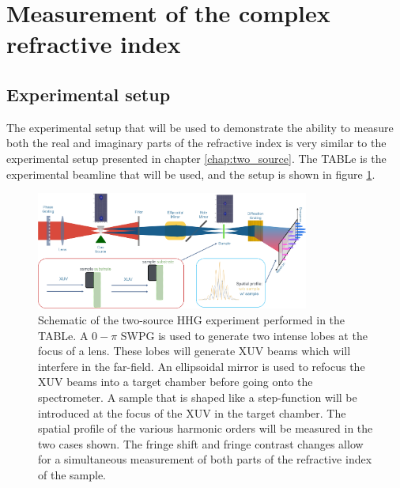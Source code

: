 \section{Measurement of the complex refractive index}
\subsection{Experimental setup}
\label{sec:experimental_setup_refrac}
The experimental setup that will be used to demonstrate the ability to measure both the real and imaginary parts of the refractive index is very similar to the experimental setup presented in chapter \ref{chap:two_source}.  The TABLe is the experimental beamline that will be used, and the setup is shown in figure \ref{fig:refract_schematic}.
\begin{figure}
	\centering
	\includegraphics[width=0.8\textwidth]{figures/refractive_index/experimental_setup.png}
	\caption[Schematic of using two-source HHG to measure the real and imaginary part of the refractive index]{Schematic of the two-source HHG experiment performed in the TABLe. A $0-\pi$ SWPG is used to generate two intense lobes at the focus of a lens.  These lobes will generate XUV beams which will interfere in the far-field.  An ellipsoidal mirror is used to refocus the XUV beams into a target chamber before going onto the spectrometer. A sample that is shaped like a step-function will be introduced at the focus of the XUV in the target chamber.  The spatial profile of the various harmonic orders will be measured in the two cases shown.  The fringe shift and fringe contrast changes allow for a simultaneous measurement of both parts of the refractive index of the sample.}
	\label{fig:refract_schematic}
\end{figure}


